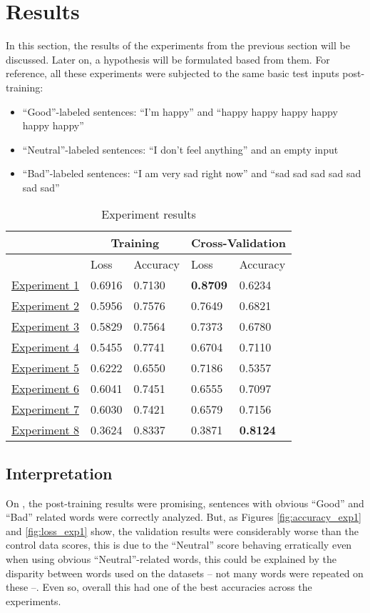 \section{Results}
In this section, the results of the experiments from the previous section will be discussed. Later on, a hypothesis will be formulated based from them. For reference, all these experiments were subjected to the same basic test inputs post-training:
\begin{itemize}
	\item ``Good''-labeled sentences: ``I'm happy'' and ``happy happy happy happy happy happy''
	\item ``Neutral''-labeled sentences: ``I don't feel anything'' and an empty input
	\item ``Bad''-labeled sentences: ``I am very sad right now'' and ``sad sad sad sad sad sad sad''
\end{itemize}
\begin{table}[!h]
	\caption{Experiment results}
	\vspace{0.5cm}
	\centering
	\begin{tabular}[t]{|l|l|l|l|l|}
	\hline
	\multicolumn{1}{|c|}{} & \multicolumn{2}{c|}{Training} & \multicolumn{2}{c|}{Cross-Validation}
	\\ \hline
	\ & Loss & Accuracy & Loss & Accuracy
	\\ \hline
	\hyperref[exp1]{Experiment 1} & 0.6916 & 0.7130 & \textbf{0.8709} & 0.6234
	\\ \hline
	\hyperref[exp2]{Experiment 2} & 0.5956 & 0.7576 & 0.7649 & 0.6821
	\\ \hline
	\hyperref[exp3]{Experiment 3} & 0.5829 & 0.7564 & 0.7373 & 0.6780
	\\ \hline
	\hyperref[exp4]{Experiment 4} & 0.5455 & 0.7741 & 0.6704 & 0.7110
	\\ \hline
	\hyperref[exp6]{Experiment 5} & 0.6222 & 0.6550 & 0.7186 & 0.5357
	\\ \hline
	\hyperref[exp7]{Experiment 6} & 0.6041 & 0.7451 & 0.6555 & 0.7097
	\\ \hline
	\hyperref[exp8]{Experiment 7} & 0.6030 & 0.7421 & 0.6579 & 0.7156
	\\ \hline
	\hyperref[exp9]{Experiment 8} & 0.3624 & 0.8337 & 0.3871 & \textbf{0.8124}
	\\ \hline
	\end{tabular}
\end{table}
\pagebreak
\subsection{Interpretation}
On , the post-training results were promising, sentences with obvious ``Good'' and ``Bad'' related words were correctly analyzed. But, as Figures \ref{fig:accuracy_exp1} and \ref{fig:loss_exp1} show, the validation results were considerably worse than the control data scores, this is due to the ``Neutral'' score behaving erratically even when using obvious ``Neutral''-related words, this could be explained by the disparity between words used on the datasets -- not many words were repeated on these --. Even so, overall this had one of the best accuracies across the experiments.

